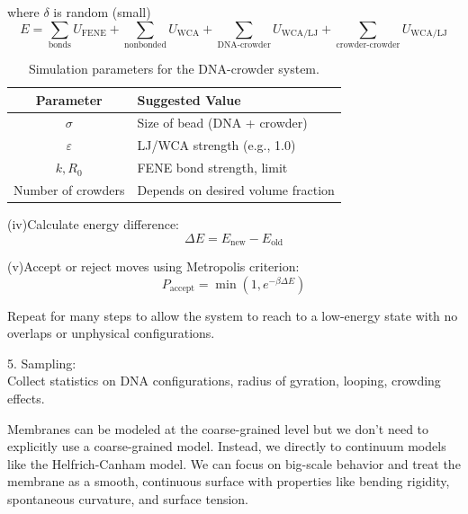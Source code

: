 \documentclass[12pt]{article}
\begin{document}
\begin{flushleft}
\setlength{\parindent}{95pt}where \(\delta\) is random (small)
\begin{equation}
E = \sum_{\text{bonds}} U_{\mathrm{FENE}} + \sum_{\text{nonbonded}} U_{\mathrm{WCA}} 
+ \sum_{\text{DNA-crowder}} U_{\mathrm{WCA/LJ}} 
+ \sum_{\text{crowder-crowder}} U_{\mathrm{WCA/LJ}}
\end{equation}

\begin{table}[htbp]
\centering
\begin{tabular}{|c|l|}
\hline
\textbf{Parameter} & \textbf{Suggested Value} \\
\hline
$\sigma$ & Size of bead (DNA + crowder) \\
\hline
$\varepsilon$ & LJ/WCA strength (e.g., 1.0) \\
\hline
$k, R_0$ & FENE bond strength, limit \\
\hline
Number of crowders & Depends on desired volume fraction \\
\hline
\end{tabular}
\caption{Simulation parameters for the DNA-crowder system.}
\end{table}


\setlength{\parindent}{0em}
\setlength{\parindent}{6em}

(iv)Calculate energy difference:
\begin{equation}
\Delta E = E_{\text{new}} - E_{\text{old}}
\end{equation}




(v)Accept or reject moves using Metropolis criterion:
\begin{equation}
P_{\text{accept}} = \min \left(1, e^{-\beta \Delta E}\right)
\end{equation}

\setlength{\parindent}{0em}

\setlength{\parindent}{4em}
Repeat for many steps to allow the system to reach to a low-energy state with no overlaps or unphysical configurations.


\setlength{\parindent}{0em}

5. Sampling:\\
Collect statistics on DNA configurations, radius of gyration, looping, crowding effects.\\


\setlength{\parindent}{45pt}

Membranes can be modeled at the coarse-grained level but we don't need to explicitly use a coarse-grained model. Instead, we directly to continuum models like the Helfrich-Canham model. We can focus on big-scale behavior and treat the membrane as a smooth, continuous surface with properties like bending rigidity, spontaneous curvature, and surface tension.



\end{flushleft}
\end{document}
